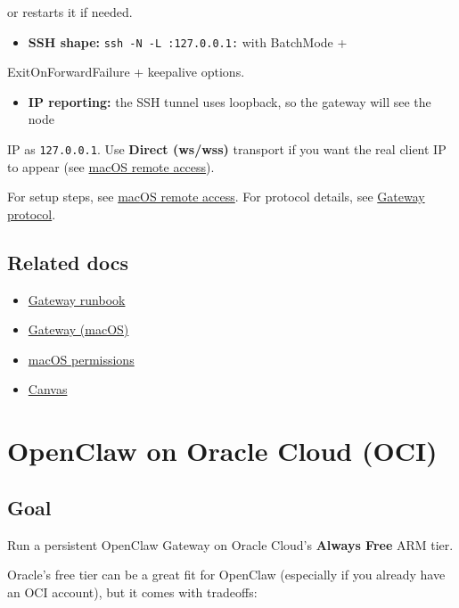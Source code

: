 or restarts it if needed.
\begin{itemize}
  \item \textbf{SSH shape:} \texttt{ssh -N -L :127.0.0.1:} with BatchMode +
\end{itemize}

ExitOnForwardFailure + keepalive options.
\begin{itemize}
  \item \textbf{IP reporting:} the SSH tunnel uses loopback, so the gateway will see the node
\end{itemize}

IP as \texttt{127.0.0.1}. Use \textbf{Direct (ws/wss)} transport if you want the real client
IP to appear (see \href{/platforms/mac/remote}{macOS remote access}).

For setup steps, see \href{/platforms/mac/remote}{macOS remote access}. For protocol
details, see \href{/gateway/protocol}{Gateway protocol}.

\subsection{Related docs}


\begin{itemize}
  \item \href{/gateway}{Gateway runbook}
  \item \href{/platforms/mac/bundled-gateway}{Gateway (macOS)}
  \item \href{/platforms/mac/permissions}{macOS permissions}
  \item \href{/platforms/mac/canvas}{Canvas}
\end{itemize}



\clearpage

\section{OpenClaw on Oracle Cloud (OCI)}


\subsection{Goal}


Run a persistent OpenClaw Gateway on Oracle Cloud's \textbf{Always Free} ARM tier.

Oracle’s free tier can be a great fit for OpenClaw (especially if you already have an OCI account), but it comes with tradeoffs:

